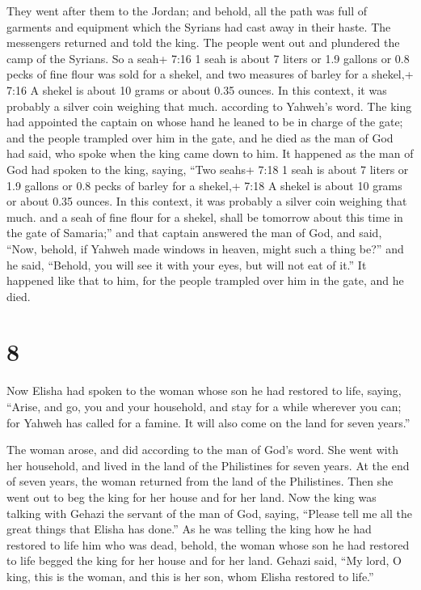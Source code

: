 They went after them to the Jordan; and behold, all the
path was full of garments and equipment which the Syrians had cast away
in their haste. The messengers returned and told the king. 
The people went out and plundered the camp of the Syrians. So a seah+
7:16 1 seah is about 7 liters or 1.9 gallons or 0.8 pecks of fine flour
was sold for a shekel, and two measures of barley for a shekel,+ 7:16 A
shekel is about 10 grams or about 0.35 ounces. In this context, it was
probably a silver coin weighing that much. according to Yahweh's word.
 The king had appointed the captain on whose hand he leaned
to be in charge of the gate; and the people trampled over him in the
gate, and he died as the man of God had said, who spoke when the king
came down to him.  It happened as the man of God had spoken
to the king, saying, ``Two seahs+ 7:18 1 seah is about 7 liters or 1.9
gallons or 0.8 pecks of barley for a shekel,+ 7:18 A shekel is about 10
grams or about 0.35 ounces. In this context, it was probably a silver
coin weighing that much. and a seah of fine flour for a shekel, shall be
tomorrow about this time in the gate of Samaria;''  and
that captain answered the man of God, and said, ``Now, behold, if Yahweh
made windows in heaven, might such a thing be?'' and he said, ``Behold,
you will see it with your eyes, but will not eat of it.'' 
It happened like that to him, for the people trampled over him in the
gate, and he died.

\hypertarget{section-7}{%
\section{8}\label{section-7}}

 Now Elisha had spoken to the woman whose son he had
restored to life, saying, ``Arise, and go, you and your household, and
stay for a while wherever you can; for Yahweh has called for a famine.
It will also come on the land for seven years.''

 The woman arose, and did according to the man of God's
word. She went with her household, and lived in the land of the
Philistines for seven years.  At the end of seven years, the
woman returned from the land of the Philistines. Then she went out to
beg the king for her house and for her land.  Now the king
was talking with Gehazi the servant of the man of God, saying, ``Please
tell me all the great things that Elisha has done.''  As he
was telling the king how he had restored to life him who was dead,
behold, the woman whose son he had restored to life begged the king for
her house and for her land. Gehazi said, ``My lord, O king, this is the
woman, and this is her son, whom Elisha restored to life.''

